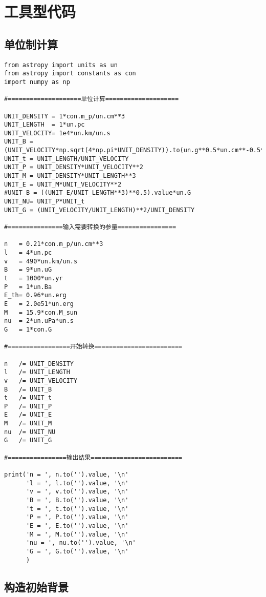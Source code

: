 \chapter{工具型代码}
\label{Code}

\section{单位制计算}
\label{Codeu}


\begin{lstlisting}
from astropy import units as un
from astropy import constants as con
import numpy as np

#====================单位计算====================

UNIT_DENSITY = 1*con.m_p/un.cm**3
UNIT_LENGTH  = 1*un.pc
UNIT_VELOCITY= 1e4*un.km/un.s
UNIT_B = (UNIT_VELOCITY*np.sqrt(4*np.pi*UNIT_DENSITY)).to(un.g**0.5*un.cm**-0.5*un.s**-1).value*un.G
UNIT_t = UNIT_LENGTH/UNIT_VELOCITY
UNIT_P = UNIT_DENSITY*UNIT_VELOCITY**2
UNIT_M = UNIT_DENSITY*UNIT_LENGTH**3
UNIT_E = UNIT_M*UNIT_VELOCITY**2
#UNIT_B = ((UNIT_E/UNIT_LENGTH**3)**0.5).value*un.G
UNIT_NU= UNIT_P*UNIT_t
UNIT_G = (UNIT_VELOCITY/UNIT_LENGTH)**2/UNIT_DENSITY

#===============输入需要转换的参量================

n   = 0.21*con.m_p/un.cm**3
l   = 4*un.pc
v   = 490*un.km/un.s
B   = 9*un.uG
t   = 1000*un.yr
P   = 1*un.Ba
E_th= 0.96*un.erg
E   = 2.0e51*un.erg
M   = 15.9*con.M_sun
nu  = 2*un.uPa*un.s
G   = 1*con.G

#=================开始转换========================

n   /= UNIT_DENSITY
l   /= UNIT_LENGTH
v   /= UNIT_VELOCITY
B   /= UNIT_B
t   /= UNIT_t
P   /= UNIT_P
E   /= UNIT_E
M   /= UNIT_M
nu  /= UNIT_NU
G   /= UNIT_G

#================输出结果=========================

print('n = ', n.to('').value, '\n'
      'l = ', l.to('').value, '\n'
      'v = ', v.to('').value, '\n'
      'B = ', B.to('').value, '\n'
      't = ', t.to('').value, '\n'
      'P = ', P.to('').value, '\n'
      'E = ', E.to('').value, '\n'
      'M = ', M.to('').value, '\n'
      'nu = ', nu.to('').value, '\n'
      'G = ', G.to('').value, '\n'
      )

\end{lstlisting}


\section{构造初始背景}
\label{Codeb}

